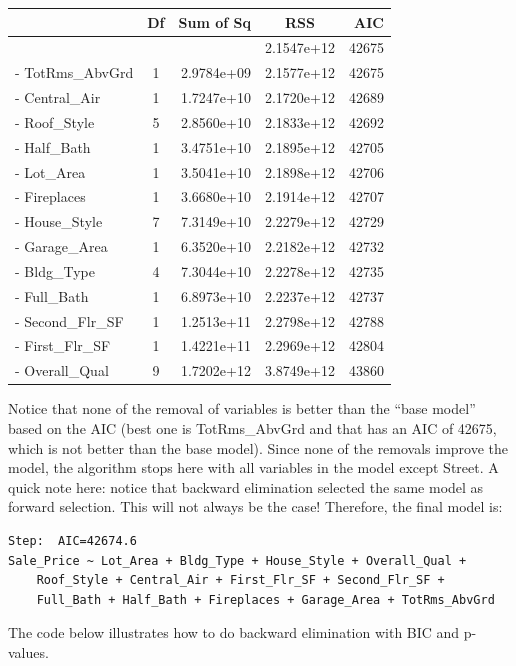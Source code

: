 \documentclass[
  letterpaper,
  DIV=11,
  numbers=noendperiod]{scrreprt}
\begin{document}
\begin{longtable}[]{@{}lcrcr@{}}
\toprule()
& Df & Sum of Sq & RSS & AIC \\
\midrule()
\endhead
& & & 2.1547e+12 & 42675 \\
- TotRms\_AbvGrd & 1 & 2.9784e+09 & 2.1577e+12 & 42675 \\
- Central\_Air & 1 & 1.7247e+10 & 2.1720e+12 & 42689 \\
- Roof\_Style & 5 & 2.8560e+10 & 2.1833e+12 & 42692 \\
- Half\_Bath & 1 & 3.4751e+10 & 2.1895e+12 & 42705 \\
- Lot\_Area & 1 & 3.5041e+10 & 2.1898e+12 & 42706 \\
- Fireplaces & 1 & 3.6680e+10 & 2.1914e+12 & 42707 \\
- House\_Style & 7 & 7.3149e+10 & 2.2279e+12 & 42729 \\
- Garage\_Area & 1 & 6.3520e+10 & 2.2182e+12 & 42732 \\
- Bldg\_Type & 4 & 7.3044e+10 & 2.2278e+12 & 42735 \\
- Full\_Bath & 1 & 6.8973e+10 & 2.2237e+12 & 42737 \\
- Second\_Flr\_SF & 1 & 1.2513e+11 & 2.2798e+12 & 42788 \\
- First\_Flr\_SF & 1 & 1.4221e+11 & 2.2969e+12 & 42804 \\
- Overall\_Qual & 9 & 1.7202e+12 & 3.8749e+12 & 43860 \\
\bottomrule()
\end{longtable}

Notice that none of the removal of variables is better than the ``base
model'' based on the AIC (best one is TotRms\_AbvGrd and that has an AIC
of 42675, which is not better than the base model). Since none of the
removals improve the model, the algorithm stops here with all variables
in the model except Street. A quick note here: notice that backward
elimination selected the same model as forward selection. This will not
always be the case! Therefore, the final model is:

\begin{verbatim}
Step:  AIC=42674.6
Sale_Price ~ Lot_Area + Bldg_Type + House_Style + Overall_Qual + 
    Roof_Style + Central_Air + First_Flr_SF + Second_Flr_SF + 
    Full_Bath + Half_Bath + Fireplaces + Garage_Area + TotRms_AbvGrd
\end{verbatim}

The code below illustrates how to do backward elimination with BIC and
p-values.
\end{document}
